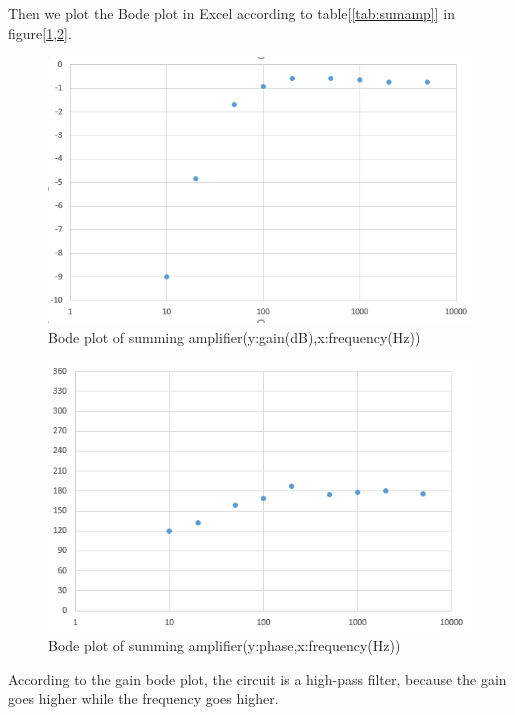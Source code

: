 \phantom{ } Then we plot the Bode plot in Excel according to table[\ref{tab:sumamp}] in figure[\ref{fig:106},\ref{fig:107}].
\begin{figure}[!htbp]
	\centering 
	\begin{framed}
		\includegraphics[width=\linewidth]{images/1_5.PNG} 
		\caption{Bode plot of summing amplifier(y:gain(dB),x:frequency(Hz))}
		\label{fig:106} 
	\end{framed}
\end{figure} 

\begin{figure}[!htbp]
	\centering 
	\begin{framed}
		\includegraphics[width=\linewidth]{images/1_6.PNG} 
		\caption{Bode plot of summing amplifier(y:phase,x:frequency(Hz))}
		\label{fig:107} 
	\end{framed}
\end{figure}

\phantom{ } According to the gain bode plot, the circuit is a high-pass filter, because the gain goes higher while the frequency goes higher.

